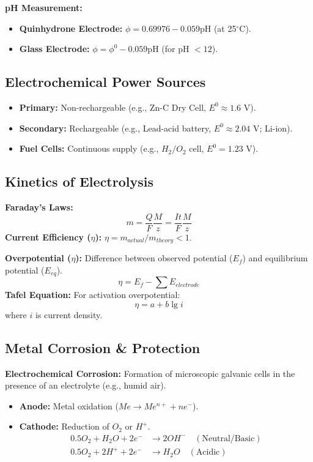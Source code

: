 \textbf{pH Measurement:}
\begin{itemize}
    \item \textbf{Quinhydrone Electrode:} $\phi = 0.69976 - 0.059 \text{pH}$ (at 25$^{\circ}$C).
    \item \textbf{Glass Electrode:} $\phi = \phi^0 - 0.059 \text{pH}$ (for pH $< 12$).
\end{itemize}

\subsection{Electrochemical Power Sources}
\begin{itemize}
    \item \textbf{Primary:} Non-rechargeable (e.g., Zn-C Dry Cell, $E^0 \approx 1.6$ V).
    \item \textbf{Secondary:} Rechargeable (e.g., Lead-acid battery, $E^0 \approx 2.04$ V; Li-ion).
    \item \textbf{Fuel Cells:} Continuous supply (e.g., $H_2/O_2$ cell, $E^0 = 1.23$ V).
\end{itemize}

\subsection{Kinetics of Electrolysis}
\textbf{Faraday's Laws:}
\begin{equation}
    m = \frac{Q}{F} \frac{M}{z} = \frac{I t}{F} \frac{M}{z}
\end{equation}
\textbf{Current Efficiency ($\eta$):} $\eta = m_{actual} / m_{theory} < 1$.

\textbf{Overpotential ($\eta$):} Difference between observed potential ($E_f$) and equilibrium potential ($E_{eq}$).
\begin{equation}
    \eta = E_f - \sum E_{electrode}
\end{equation}
\textbf{Tafel Equation:} For activation overpotential:
\begin{equation}
    \eta = a + b \lg i
\end{equation}
where $i$ is current density.

\subsection{Metal Corrosion \& Protection}
\textbf{Electrochemical Corrosion:} Formation of microscopic galvanic cells in the presence of an electrolyte (e.g., humid air).
\begin{itemize}
    \item \textbf{Anode:} Metal oxidation ($Me \to Me^{n+} + ne^-$).
    \item \textbf{Cathode:} Reduction of $O_2$ or $H^+$.
        \begin{align}
            0.5 O_2 + H_2O + 2e^- &\to 2OH^- \quad (\text{Neutral/Basic}) \\
            0.5 O_2 + 2H^+ + 2e^- &\to H_2O \quad (\text{Acidic})
        \end{align}
\end{itemize}

